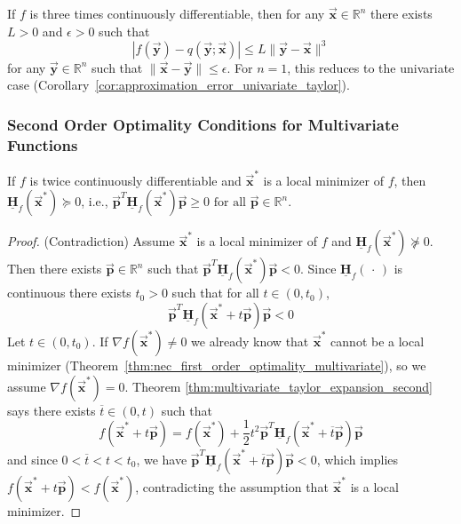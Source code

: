 \documentclass[9pt, headings=standardclasses, parskip=half]{scrartcl}
\newcommand{\matr}[1]{\underline{\boldsymbol{#1}}}
\newcommand{\vect}[1]{\vec{\boldsymbol{#1}}}
\begin{document}
\begin{corollary}
\label{cor:approximation_error_multivariate_taylor_second}
If \(f\) is three times continuously differentiable, then for any \(\vect{x}\in\mathbb{R}^{n}\) there exists \(L>0\) and \(\epsilon>0\) such that
\[
\left|f(\vect{y})-q(\vect{y};\vect{x})\right|\le L\|\vect{y}-\vect{x}\|^3 %
\]
for any \(\vect{y}\in\mathbb{R}^{n}\) such that \(\|\vect{x}-\vect{y}\|\le\epsilon\). For \(n=1\), this reduces to the univariate case (Corollary~\ref{cor:approximation_error_univariate_taylor}).
\end{corollary}

\subsubsection{Second Order Optimality Conditions for Multivariate Functions}
\label{subsubsec:second_order_optimality_conditions}
\begin{theorem}
\label{thm:second_order_necessary_optimality_condition_multivariate}
If \(f\) is twice continuously differentiable and \(\vect{x}^{*}\) is a local minimizer of \(f\), then \(\matr{H}_{f}(\vect{x}^{*})\succeq 0\), i.e., \(\vect{p}^{T}\matr{H}_{f}(\vect{x}^{*})\vect{p}\ge 0 \text{ for all } \vect{p}\in\mathbb{R}^{n}\).
\end{theorem}
\begin{proof} (Contradiction)
Assume \(\vect{x}^{*}\) is a local minimizer of \(f\) and \(\matr{H}_{f}(\vect{x}^{*})\not \succeq 0\). 
Then there exists \(\vect{p}\in\mathbb{R}^{n}\) such that \(\vect{p}^{T}\matr{H}_{f}(\vect{x}^{*})\vect{p}<0\). 
Since \(\matr{H}_{f}(\, \cdot \,)\) is continuous there exists \(t_{0}>0\) such that for all \(t\in(0,t_{0})\), 
\[
\vect{p}^{T}\matr{H}_{f}(\vect{x}^{*}+t\vect{p})\vect{p}<0 %
\]
Let \(t \in (0,t_{0})\). If \(\nabla f(\vect{x}^{*}) \neq 0\) we already know that \(\vect{x}^{*}\) cannot be a local minimizer (Theorem~\ref{thm:nec_first_order_optimality_multivariate}), so we assume \(\nabla f(\vect{x}^{*}) = 0\). 
Theorem \ref{thm:multivariate_taylor_expansion_second} says there exists \(\overline{t}\in(0,t)\) such that
\[
f(\vect{x}^{*}+t\vect{p})=f(\vect{x}^{*})+\frac{1}{2}t^{2}\vect{p}^{T}\matr{H}_{f}(\vect{x}^{*}+\overline{t}\vect{p})\vect{p} %
\]
and since \(0 < \overline{t} < t < t_{0}\), we have \(\vect{p}^{T}\matr{H}_{f}(\vect{x}^{*}+\overline{t}\vect{p})\vect{p}<0\), which implies \(f(\vect{x}^{*}+t\vect{p})<f(\vect{x}^{*})\), contradicting the assumption that \(\vect{x}^{*}\) is a local minimizer.
\end{proof}
\end{document}
